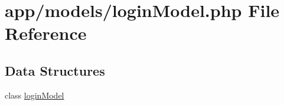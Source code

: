 \hypertarget{login_model_8php}{}\section{app/models/login\+Model.php File Reference}
\label{login_model_8php}
\subsection*{Data Structures}
\begin{DoxyCompactItemize}
\item 
class \hyperlink{classlogin_model}{login\+Model}
\end{DoxyCompactItemize}

